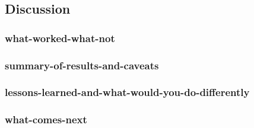 \subsection{Discussion}
\label{sec:discussion}

\subsubsection{what-worked-what-not}
\subsubsection{summary-of-results-and-caveats}
\subsubsection{lessons-learned-and-what-would-you-do-differently}
\subsubsection{what-comes-next}
